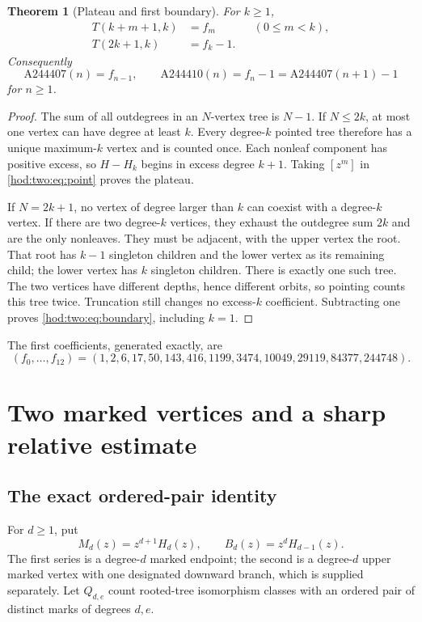 \documentclass[11pt,letterpaper]{article}
\newtheorem{theorem}{Theorem}[section]
\theoremstyle{definition}\newtheorem{definition}[theorem]{Definition}
\theoremstyle{remark}\newtheorem{remark}[theorem]{Remark}
\begin{document}
\begin{theorem}[Plateau and first boundary]\label{hod:two:thm:plateau}
For $k\ge1$,
\begin{align}
T(k+m+1,k)&=f_m &&(0\le m<k),\\
T(2k+1,k)&=f_k-1.\label{hod:two:eq:boundary}
\end{align}
Consequently
\begin{equation}\label{hod:two:eq:oeis}
\mathrm{A244407}(n)=f_{n-1},\qquad
\mathrm{A244410}(n)=f_n-1=\mathrm{A244407}(n+1)-1
\end{equation}
for $n\ge1$.
\end{theorem}
\begin{proof}
The sum of all outdegrees in an $N$-vertex tree is $N-1$. If $N\le2k$, at most one vertex can have degree at least $k$. Every degree-$k$ pointed tree therefore has a unique maximum-$k$ vertex and is counted once. Each nonleaf component has positive excess, so $H-H_k$ begins in excess degree $k+1$. Taking $[z^m]$ in \eqref{hod:two:eq:point} proves the plateau.

If $N=2k+1$, no vertex of degree larger than $k$ can coexist with a degree-$k$ vertex. If there are two degree-$k$ vertices, they exhaust the outdegree sum $2k$ and are the only nonleaves. They must be adjacent, with the upper vertex the root. That root has $k-1$ singleton children and the lower vertex as its remaining child; the lower vertex has $k$ singleton children. There is exactly one such tree. The two vertices have different depths, hence different orbits, so pointing counts this tree twice. Truncation still changes no excess-$k$ coefficient. Subtracting one proves \eqref{hod:two:eq:boundary}, including $k=1$.
\end{proof}
The first coefficients, generated exactly, are
\[
(f_0,\ldots,f_{12})=(1,2,6,17,50,143,416,1199,3474,10049,29119,84377,244748).
\]

\section{Two marked vertices and a sharp relative estimate}
\subsection{The exact ordered-pair identity}
For $d\ge1$, put
\begin{equation}\label{hod:two:eq:MB}
M_d(z)=z^{d+1}H_d(z),\qquad B_d(z)=z^dH_{d-1}(z).
\end{equation}
The first series is a degree-$d$ marked endpoint; the second is a degree-$d$ upper marked vertex with one designated downward branch, which is supplied separately. Let $Q_{d,e}$ count rooted-tree isomorphism classes with an ordered pair of distinct marks of degrees $d,e$.
\end{document}
